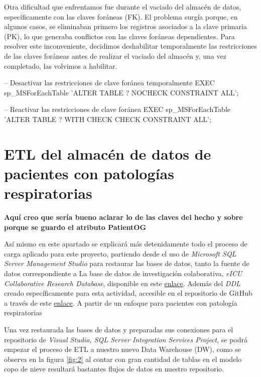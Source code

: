 \documentclass[12pt, a4paper, twoside]{article}
\begin{document}
	Otra dificultad que enfrentamos fue durante el vaciado del almacén de datos, específicamente con las claves foráneas (FK). El problema surgía porque, en algunos casos, se eliminaban primero los registros asociados a la clave primaria (PK), lo que generaba conflictos con las claves foráneas dependientes. Para resolver este inconveniente, decidimos deshabilitar temporalmente las restricciones de las claves foráneas antes de realizar el vaciado del almacén y, una vez completado, las volvimos a habilitar.
	
	-- Desactivar las restricciones de clave foránea temporalmente
	EXEC sp\_MSForEachTable 'ALTER TABLE ? NOCHECK CONSTRAINT ALL';
	
	-- Reactivar las restricciones de clave foránea
	EXEC sp\_MSForEachTable 'ALTER TABLE ? WITH CHECK CHECK CONSTRAINT ALL';
	
	\vspace{4cm}
	
	\section{ETL del almacén de datos de pacientes con patologías respiratorias}
	
	\textbf{Aquí creo que sería bueno aclarar lo de las claves del hecho y sobre porque se guardo el atributo PatientOG}
	
	Así mismo en este apartado se explicará más detenidamente todo el proceso de carga aplicado para este proyecto, partiendo desde el uso de \textit{Microsoft SQL Server Management Studio} para restaurar las bases de datos, tanto la fuente de datos correspondiente a La base de datos de investigación colaborativa, \textit{eICU Collaborative Research Database}, disponible en este \href{https://uma365-my.sharepoint.com/:u:/g/personal/rmluque_uma_es/EebuEtDjp8VImt-_PhweiZMBu1_7XkPqZHkD74iGgg0fXQ?e=lOivcI}{enlace}. Además del \textit{DDL} creado específicamente para esta actividad, accesible en el repositorio de GitHub a través de este \href{https://github.com/Diegodepab/almacen_UCI_Sanitaria/blob/main/ETL/base_de_datos.ddl}{enlace}. A partir de un enfoque para pacientes con patología respiratorias 
	
	Una vez restaurada las bases de datos y preparadas sus conexiones para el repositorio de \textit{Visual Studio, SQL Server Integration Services Project}, se podrá empezar el proceso de ETL a nuestro nuevo Data Warehouse (DW), como se observa en la figura \ref{fig:2} al contar con gran cantidad de tablas en el modelo copo de nieve resultará bastantes flujos de datos en nuestro repositorio.
	
\end{document}
